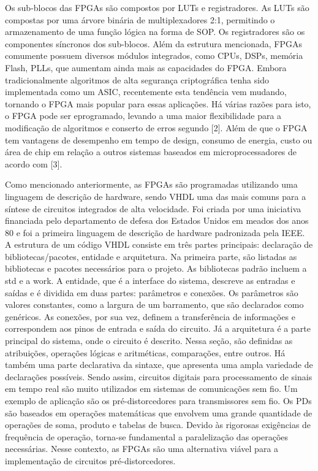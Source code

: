 Os sub-blocos das FPGAs são compostos por LUTs e registradores. As LUTs são compostas por uma árvore binária de multiplexadores 2:1, permitindo o armazenamento de uma função lógica na forma de SOP. Os registradores são os componentes síncronos dos sub-blocos. Além da estrutura mencionada, FPGAs comumente possuem diversos módulos integrados, como CPUs, DSPs, memória Flash, PLLs, que aumentam ainda mais as capacidades do FPGA.
Embora tradicionalmente algoritmos de alta segurança criptográfica tenha sido implementada como um ASIC, recentemente esta tendência vem mudando, tornando o FPGA mais popular para essas aplicações. Há várias razões para isto, o FPGA pode ser  eprogramado, levando a uma maior flexibilidade para a modificação de algoritmos e conserto de erros segundo [2]. Além de que o FPGA tem vantagens de
desempenho em tempo de design, consumo de energia, custo ou área de chip em
relação a outros sistemas baseados em microprocessadores de acordo com [3].




Como mencionado anteriormente, as FPGAs são programadas utilizando uma linguagem de descrição de hardware, sendo VHDL uma das mais comuns para a síntese de circuitos integrados de alta velocidade. Foi criada por uma iniciativa financiada pelo departamento de defesa dos Estados Unidos em meados dos anos 80 e foi a primeira linguagem de descrição de hardware padronizada pela IEEE.
A estrutura de um código VHDL consiste em três partes principais: declaração de bibliotecas/pacotes, entidade e arquitetura. Na primeira parte, são listadas as bibliotecas e pacotes necessários para o projeto. As bibliotecas padrão incluem a std e a work. A entidade, que é a interface do sistema, descreve as entradas e saídas e é dividida em duas partes: parâmetros e conexões. Os parâmetros são valores constantes, como a largura de um barramento, que são declarados como genéricos. As conexões, por sua vez, definem a transferência de informações e correspondem aos pinos de entrada e saída do circuito. Já a arquitetura é a parte principal do sistema, onde o circuito é descrito. Nessa seção, são definidas as atribuições, operações lógicas e aritméticas, comparações, entre outros. Há também uma parte declarativa da sintaxe, que apresenta uma ampla variedade de declarações possíveis.
Sendo assim, circuitos digitais para processamento de sinais em tempo real são muito utilizados em sistemas de comunicações sem fio. Um exemplo de aplicação são os pré-distorcedores para transmissores sem fio. Os PDs são baseados em operações matemáticas que envolvem uma grande quantidade de operações de soma, produto e tabelas de busca. Devido às rigorosas exigências de frequência de operação, torna-se fundamental a paralelização das operações necessárias. Nesse contexto, as FPGAs são uma alternativa viável para a implementação de circuitos pré-distorcedores.